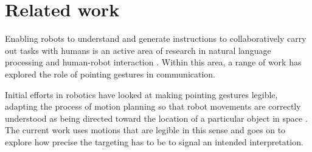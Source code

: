 \section{Related work}
\label{related-work}


Enabling robots to understand and generate instructions to collaboratively carry out tasks with humans is an active area of research in natural language processing and human-robot interaction \cite{butepage2017human,cha2018survey}.  Within this area, a range of work has explored the role of pointing gestures in communication.

Initial efforts in robotics have looked at making pointing gestures legible, adapting the process of motion planning so that robot movements are correctly understood as being directed toward the location of a particular object in space \cite{holladay2014legible,zhao2016experimental}.  The current work uses motions that are legible in this sense and goes on to explore how precise the targeting has to be to signal an intended interpretation.




